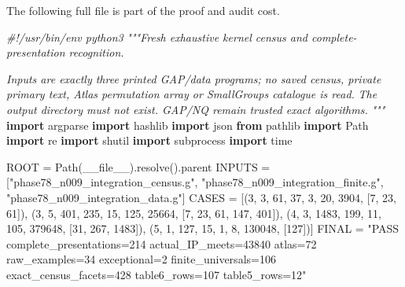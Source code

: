 \documentclass[
  10pt,
  letterpaper,
]{article}
\newenvironment{Shaded}{}{}
\newcommand{\CommentTok}[1]{\textcolor[rgb]{0.38,0.63,0.69}{\textit{#1}}}
\newcommand{\DecValTok}[1]{\textcolor[rgb]{0.25,0.63,0.44}{#1}}
\newcommand{\ImportTok}[1]{\textcolor[rgb]{0.00,0.50,0.00}{\textbf{#1}}}
\newcommand{\NormalTok}[1]{#1}
\newcommand{\OperatorTok}[1]{\textcolor[rgb]{0.40,0.40,0.40}{#1}}
\newcommand{\StringTok}[1]{\textcolor[rgb]{0.25,0.44,0.63}{#1}}
\newcommand{\VariableTok}[1]{\textcolor[rgb]{0.10,0.09,0.49}{#1}}
\begin{document}
The following full file is part of the proof and audit cost.

\begin{Shaded}
\begin{Highlighting}[]
\CommentTok{\#!/usr/bin/env python3}
\CommentTok{"""Fresh exhaustive kernel census and complete{-}presentation recognition.}

\CommentTok{Inputs are exactly three printed GAP/data programs; no saved census, private}
\CommentTok{primary text, Atlas permutation array or SmallGroups catalogue is read.}
\CommentTok{The output directory must not exist. GAP/NQ remain trusted exact algorithms.}
\CommentTok{"""}
\ImportTok{import}\NormalTok{ argparse}
\ImportTok{import}\NormalTok{ hashlib}
\ImportTok{import}\NormalTok{ json}
\ImportTok{from}\NormalTok{ pathlib }\ImportTok{import}\NormalTok{ Path}
\ImportTok{import}\NormalTok{ re}
\ImportTok{import}\NormalTok{ shutil}
\ImportTok{import}\NormalTok{ subprocess}
\ImportTok{import}\NormalTok{ time}

\NormalTok{ROOT }\OperatorTok{=}\NormalTok{ Path(}\VariableTok{\_\_file\_\_}\NormalTok{).resolve().parent}
\NormalTok{INPUTS }\OperatorTok{=}\NormalTok{ [}\StringTok{"phase78\_n009\_integration\_census.g"}\NormalTok{, }\StringTok{"phase78\_n009\_integration\_finite.g"}\NormalTok{, }\StringTok{"phase78\_n009\_integration\_data.g"}\NormalTok{]}
\NormalTok{CASES }\OperatorTok{=}\NormalTok{ [(}\DecValTok{3}\NormalTok{, }\DecValTok{3}\NormalTok{, }\DecValTok{61}\NormalTok{, }\DecValTok{37}\NormalTok{, }\DecValTok{3}\NormalTok{, }\DecValTok{20}\NormalTok{, }\DecValTok{3904}\NormalTok{, [}\DecValTok{7}\NormalTok{, }\DecValTok{23}\NormalTok{, }\DecValTok{61}\NormalTok{]), (}\DecValTok{3}\NormalTok{, }\DecValTok{5}\NormalTok{, }\DecValTok{401}\NormalTok{, }\DecValTok{235}\NormalTok{, }\DecValTok{15}\NormalTok{, }\DecValTok{125}\NormalTok{, }\DecValTok{25664}\NormalTok{, [}\DecValTok{7}\NormalTok{, }\DecValTok{23}\NormalTok{, }\DecValTok{61}\NormalTok{, }\DecValTok{147}\NormalTok{, }\DecValTok{401}\NormalTok{]), (}\DecValTok{4}\NormalTok{, }\DecValTok{3}\NormalTok{, }\DecValTok{1483}\NormalTok{, }\DecValTok{199}\NormalTok{, }\DecValTok{11}\NormalTok{, }\DecValTok{105}\NormalTok{, }\DecValTok{379648}\NormalTok{, [}\DecValTok{31}\NormalTok{, }\DecValTok{267}\NormalTok{, }\DecValTok{1483}\NormalTok{]), (}\DecValTok{5}\NormalTok{, }\DecValTok{1}\NormalTok{, }\DecValTok{127}\NormalTok{, }\DecValTok{15}\NormalTok{, }\DecValTok{1}\NormalTok{, }\DecValTok{8}\NormalTok{, }\DecValTok{130048}\NormalTok{, [}\DecValTok{127}\NormalTok{])]}
\NormalTok{FINAL }\OperatorTok{=} \StringTok{"PASS complete\_presentations=214 actual\_IP\_meets=43840 atlas=72 raw\_examples=34 exceptional=2 finite\_universals=106 exact\_census\_facets=428 table6\_rows=107 table5\_rows=12"}



\end{Highlighting}
\end{Shaded}
\end{document}
